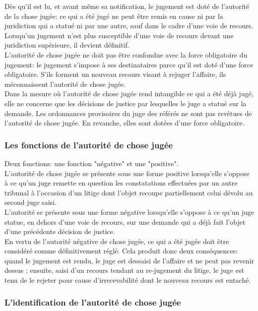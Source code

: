 \documentclass[10pt, a4paper, openany]{book}
\begin{document}
Dès qu'il est lu, et avant même sa notification, le jugement est doté de l'autorité de la chose jugée: ce qui a été jugé ne peut être remis en cause ni par la juridiction qui a statué ni par une autre, sauf dans le cadre d'une voie de recours. \\
Lorsqu'un jugement n'est plus susceptible d'une voie de recours devant une juridiction supérieure, il devient définitif. \\
L'autorité de chose jugée ne doit pas être confondue avec la force obligatoire du jugement: le jugement s'impose à ses destinataires parce qu'il est doté d'une force obligatoire. S'ils forment un nouveau recours visant à rejuger l'affaire, ils méconnaissent l'autorité de chose jugée. \\
Dans la mesure où l'autorité de chose jugée rend intangible ce qui a été déjà jugé, elle ne concerne que les décisions de justice par lesquelles le juge a statué sur la demande. Les ordonnances provisoires du juge des référés ne sont pas revêtues de l'autorité de chose jugée. En revanche, elles sont dotées d'une force obligatoire. 

\subsubsection{Les fonctions de l'autorité de chose jugée}

Deux fonctions: une fonction "négative" et une "positive". \\
L'autorité de chose jugée se présente sous une forme positive lorsqu'elle s'oppose à ce qu'un juge remette en question les constatations effectuées par un autre tribunal à l'occasion d'un litige dont l'objet recoupe partiellement celui dévolu au second juge saisi. \\
L'autorité se présente sous une forme négative lorsqu'elle s'oppose à ce qu'un juge statue, en dehors d'une voie de recours, sur une demande qui a déjà fait l'objet d'une précédente décision de justice. \\
En vertu de l'autorité négative de chose jugée, ce qui a été jugée doit être considéré comme définitivement réglé. Cela produit donc deux conséquences: quand le jugement est rendu, le juge est dessaisi de l'affaire et ne peut pas revenir dessus ; ensuite, saisi d'un recours tendant au re-jugement du litige, le juge est tenu de le rejeter pour cause d'irrecevabilité dont le nouveau recours est entaché. 

\subsubsection{L'identification de l'autorité de chose jugée}
\end{document}
